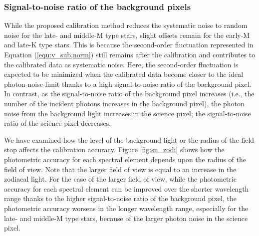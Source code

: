 \documentclass{aastex62}
\begin{document}
\subsubsection{Signal-to-noise ratio of the background pixels} \label{subsubsec:sn_zodi}

While the proposed calibration method reduces the systematic noise to random noise for the late- and middle-M type stars, slight offsets remain for the early-M and late-K type stars. This is because the second-order fluctuation represented in Equation (\ref{equ:v_sub,norm}) still remains after the calibration and contributes to the calibrated data as systematic noise. Here, the second-order fluctuation is expected to be minimized when the calibrated data become closer to the ideal photon-noise-limit thanks to a high signal-to-noise ratio of the background pixel. In contrast, as the signal-to-noise ratio of the background pixel increases (i.e., the number of the incident photons increases in the background pixel), the photon noise from the background light  increases in the science pixel; the signal-to-noise ratio of the science pixel decreases.

We have examined how the level of the background light or the radius of the field stop affects the calibration accuracy. Figure \ref{fig:sn_zodi} shows how the photometric accuracy for each spectral element depends upon the radius of the field of view. Note that the larger field of view is equal to an increase in the zodiacal light. For the case of the larger field of view, while the photometric accuracy for each spectral element can be improved over the shorter wavelength range thanks to the higher signal-to-noise ratio of the background pixel, the photometric accuracy worsens in the longer wavelength range, especially for the late- and middle-M type stars, because of the larger photon noise in the science pixel.
\end{document}
